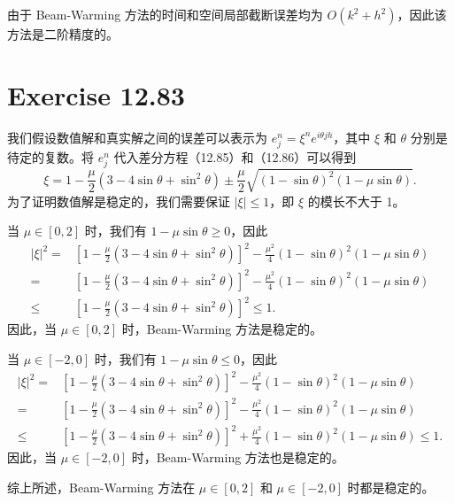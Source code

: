 \documentclass[twoside,a4paper]{article}
\begin{document}
由于 Beam-Warming 方法的时间和空间局部截断误差均为 $O(k^2 + h^2)$，因此该方法是二阶精度的。

\section{Exercise 12.83}
我们假设数值解和真实解之间的误差可以表示为 $e_j^n = \xi^n e^{i\theta jh}$，其中 $\xi$ 和 $\theta$ 分别是待定的复数。将 $e_j^n$ 代入差分方程（12.85）和（12.86）可以得到
$$
\xi = 1 - \frac{\mu}{2}(3 - 4\sin\theta + \sin^2\theta) \pm \frac{\mu}{2}\sqrt{(1 - \sin\theta)^2(1 - \mu\sin\theta)}.
$$
为了证明数值解是稳定的，我们需要保证 $\left|\xi\right|\leq 1$，即 $\xi$ 的模长不大于 1。

当 $\mu\in[0,2]$ 时，我们有 $1-\mu\sin\theta\geq 0$，因此
$$
\begin{aligned}
\left|\xi\right|^2 =& \left[1 - \frac{\mu}{2}(3 - 4\sin\theta + \sin^2\theta)\right]^2 - \frac{\mu^2}{4}(1 - \sin\theta)^2(1 - \mu\sin\theta)\\
=& \left[1 - \frac{\mu}{2}(3 - 4\sin\theta + \sin^2\theta)\right]^2 - \frac{\mu^2}{4}(1 - \sin\theta)^2(1 - \mu\sin\theta)\\
\leq& \left[1 - \frac{\mu}{2}(3 - 4\sin\theta + \sin^2\theta)\right]^2 \leq 1.
\end{aligned}
$$
因此，当 $\mu\in[0,2]$ 时，Beam-Warming 方法是稳定的。

当 $\mu\in[-2,0]$ 时，我们有 $1-\mu\sin\theta\leq 0$，因此
$$
\begin{aligned}
\left|\xi\right|^2 =& \left[1 - \frac{\mu}{2}(3 - 4\sin\theta + \sin^2\theta)\right]^2 - \frac{\mu^2}{4}(1 - \sin\theta)^2(1 - \mu\sin\theta)\\
=& \left[1 - \frac{\mu}{2}(3 - 4\sin\theta + \sin^2\theta)\right]^2 - \frac{\mu^2}{4}(1 - \sin\theta)^2(1 - \mu\sin\theta)\\
\leq& \left[1 - \frac{\mu}{2}(3 - 4\sin\theta + \sin^2\theta)\right]^2 + \frac{\mu^2}{4}(1 - \sin\theta)^2(1 - \mu\sin\theta) \leq 1.
\end{aligned}
$$
因此，当 $\mu\in[-2,0]$ 时，Beam-Warming 方法也是稳定的。

综上所述，Beam-Warming 方法在 $\mu\in[0,2]$ 和 $\mu\in[-2,0]$ 时都是稳定的。
\end{document}
